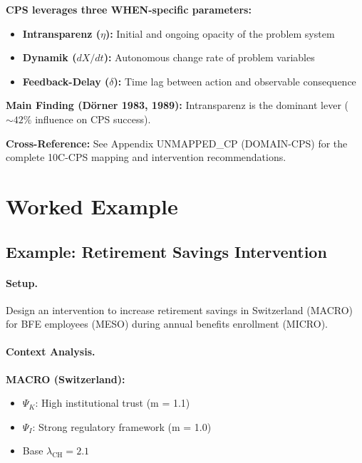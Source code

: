 \begin{tcolorbox}[colback=green!5!white, colframe=green!75!black,
    title=Application Domain: Complex Problem Solving (CP)]
\textbf{CPS leverages three WHEN-specific parameters:}
\begin{itemize}[nosep]
\item \textbf{Intransparenz ($\eta$):} Initial and ongoing opacity of the problem system
\item \textbf{Dynamik ($dX/dt$):} Autonomous change rate of problem variables
\item \textbf{Feedback-Delay ($\delta$):} Time lag between action and observable consequence
\end{itemize}

\textbf{Main Finding (Dörner 1983, 1989):} Intransparenz is the dominant lever ($\sim 42\%$ influence on CPS success).

\textbf{Cross-Reference:} See Appendix UNMAPPED_CP (DOMAIN-CPS) for the complete 10C-CPS mapping and intervention recommendations.
\end{tcolorbox}


\section{Worked Example}
\label{sec:when-example}

\subsection{Example: Retirement Savings Intervention}

\paragraph{Setup.}
Design an intervention to increase retirement savings in Switzerland (MACRO)
for BFE employees (MESO) during annual benefits enrollment (MICRO).

\paragraph{Context Analysis.}

\textbf{MACRO (Switzerland):}
\begin{itemize}[nosep]
\item $\Psi_K$: High institutional trust (m = 1.1)
\item $\Psi_I$: Strong regulatory framework (m = 1.0)
\item Base $\lambda_{\text{CH}} = 2.1$
\end{itemize}

